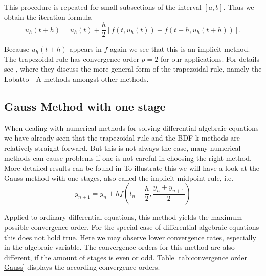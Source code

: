 	This procedure is repeated for small subsections of the interval $[a,b]$. Thus we obtain the iteration formula
	\begin{displaymath}
		u_h (t+h) = u_h(t) +\frac{h}{2}[f(t,u_h(t)) + f(t+h, u_h(t+h))].
	\end{displaymath}
%	
	
	Because $u_h(t+h)$ appears in $f$ again we see that this is an implicit method. %
	The trapezoidal rule has convergence order $p=2$ for our applications. For details see \cite{HairerErnst1989Tnso}, where they discuss the more general form of the trapezoidal rule, namely the Lobatto~~A methods amongst other methods.
	
	
\subsection{Gauss Method with one stage}

	When dealing with numerical methods for solving differential algebraic equations we have already seen that the trapezoidal rule and the BDF-k methods are relatively straight forward. But this is not always the case, many numerical methods can cause problems if one is not careful in choosing the right method. More detailed results can be found in \cite{HairerErnst1989Tnso}
	To illustrate this we will have a look at the Gauss method with one stages, also called the implicit midpoint rule, i.e.
	\begin{displaymath}
		y_{n+1} = y_n + h f(t_n + \frac{h}{2}, \frac{y_n + y_{n+1}}{2})
	\end{displaymath}

	Applied to ordinary differential equations, this method yields the maximum possible convergence order. For the special case of differential algebraic equations this does not hold true. Here we may observe lower convergence rates, especially in the algebraic variable. The convergence orders for this method are also different, if the amount of stages is even or odd. Table \ref{tab:convergence order Gauss} displays the according convergence orders.
	
